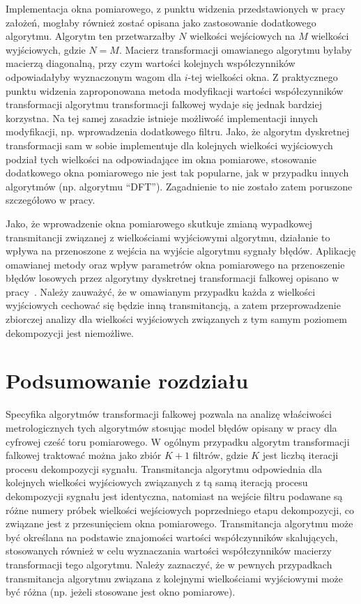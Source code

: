 Implementacja okna pomiarowego, z punktu widzenia przedstawionych w pracy założeń, mogłaby również zostać opisana jako zastosowanie dodatkowego algorytmu. Algorytm ten przetwarzałby $N$ wielkości wejściowych na $M$ wielkości wyjściowych, gdzie $N = M$. Macierz transformacji omawianego algorytmu byłaby macierzą diagonalną, przy czym wartości kolejnych współczynników odpowiadałyby wyznaczonym wagom dla $i$-tej wielkości okna. Z praktycznego punktu widzenia zaproponowana metoda modyfikacji wartości współczynników transformacji algorytmu transformacji falkowej wydaje się jednak bardziej korzystna. Na tej samej zasadzie istnieje możliwość implementacji innych modyfikacji, np. wprowadzenia dodatkowego filtru. Jako, że algorytm dyskretnej transformacji sam w sobie implementuje dla kolejnych wielkości wyjściowych podział tych wielkości na odpowiadające im okna pomiarowe, stosowanie dodatkowego okna pomiarowego nie jest tak popularne, jak w przypadku innych algorytmów (np. algorytmu \enquote{DFT}). Zagadnienie to nie zostało zatem poruszone szczegółowo w pracy.

Jako, że wprowadzenie okna pomiarowego skutkuje zmianą wypadkowej transmitancji związanej z wielkościami wyjściowymi algorytmu, działanie to wpływa na przenoszone z wejścia na wyjście algorytmu sygnały błędów. Aplikację omawianej metody oraz wpływ parametrów okna pomiarowego na przenoszenie błędów losowych przez algorytmy dyskretnej transformacji falkowej opisano w pracy~\cite{auth_window}. Należy zauważyć, że w omawianym przypadku każda z wielkości wyjściowych cechować się będzie inną transmitancją, a zatem przeprowadzenie zbiorczej analizy dla wielkości wyjściowych związanych z tym samym poziomem dekompozycji jest niemożliwe.

\section{Podsumowanie rozdziału}

Specyfika algorytmów transformacji falkowej pozwala na analizę właściwości metrologicznych tych algorytmów stosując model błędów opisany w pracy dla cyfrowej cześć toru pomiarowego. W ogólnym przypadku algorytm transformacji falkowej traktować można jako zbiór $K+1$ filtrów, gdzie $K$ jest liczbą iteracji procesu dekompozycji sygnału. Transmitancja algorytmu odpowiednia dla kolejnych wielkości wyjściowych związanych z tą samą iteracją procesu dekompozycji sygnału jest identyczna, natomiast na wejście filtru podawane są różne numery próbek wielkości wejściowych poprzedniego etapu dekompozycji, co związane jest z przesunięciem okna pomiarowego. Transmitancja algorytmu może być określana na podstawie znajomości wartości współczynników skalujących, stosowanych również w celu wyznaczania wartości współczynników macierzy transformacji tego algorytmu. Należy zaznaczyć, że w pewnych przypadkach transmitancja algorytmu związana z kolejnymi wielkościami wyjściowymi może być różna (np. jeżeli stosowane jest okno pomiarowe).

